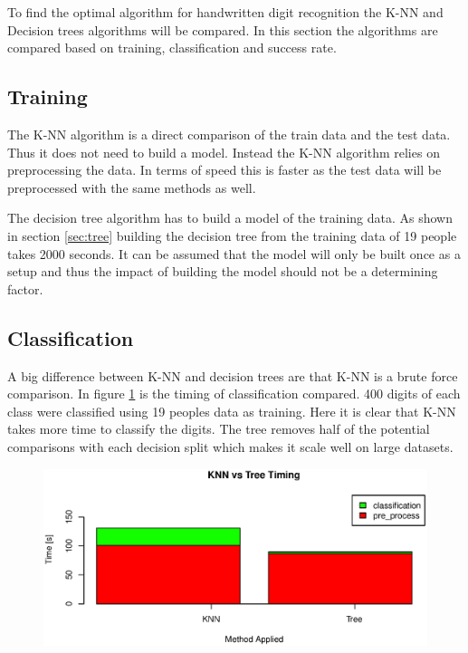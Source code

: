 To find the optimal algorithm for handwritten digit recognition the K-NN and Decision trees algorithms will be compared.
In this section the algorithms are compared based on training, classification and success rate.

\subsection{Training}
The K-NN algorithm is a direct comparison of the train data and the test data.
Thus it does not need to build a model.
Instead the K-NN algorithm relies on preprocessing the data.
In terms of speed this is faster as the test data will be preprocessed with the same methods as well.

The decision tree algorithm has to build a model of the training data. 
As shown in section \ref{sec:tree} building the decision tree from the training data of 19 people takes 2000 seconds.
It can be assumed that the model will only be built once as a setup and thus the impact of building the model should not be a determining factor.

\subsection{Classification}
A big difference between K-NN and decision trees are that K-NN is a brute force comparison.
In figure \ref{fig:algo_compare_timing} is the timing of classification compared.
400 digits of each class were classified using 19 peoples data as training.
Here it is clear that K-NN takes more time to classify the digits.
The tree removes half of the potential comparisons with each decision split which makes it scale well on large datasets.

\begin{figure}[H]
\centering
\includegraphics[width=\textwidth]{graphics/algo_compare_timing}
\label{fig:algo_compare_timing}
\end{figure}

